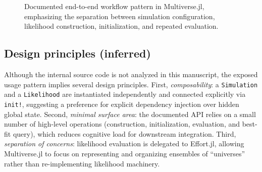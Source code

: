 \documentclass[11pt]{article}
\begin{document}
\begin{figure}[h]
  \centering
  \caption{Documented end-to-end workflow pattern in Multiverse.jl, emphasizing the separation between simulation configuration, likelihood construction, initialization, and repeated evaluation.}
\end{figure}

\subsection{Design principles (inferred)}
Although the internal source code is not analyzed in this manuscript, the exposed usage pattern implies several design principles.
First, \emph{composability}: a \texttt{Simulation} and a \texttt{Likelihood} are instantiated independently and connected explicitly via \texttt{init!}, suggesting a preference for explicit dependency injection over hidden global state.
Second, \emph{minimal surface area}: the documented API relies on a small number of high-level operations (construction, initialization, evaluation, and best-fit query), which reduces cognitive load for downstream integration.
Third, \emph{separation of concerns}: likelihood evaluation is delegated to Effort.jl, allowing Multiverse.jl to focus on representing and organizing ensembles of ``universes'' rather than re-implementing likelihood machinery.
\end{document}
